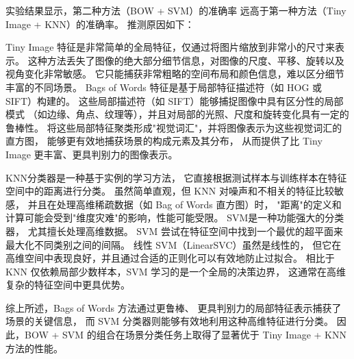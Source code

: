 实验结果显示，第二种方法（BOW + SVM）的准确率
远高于第一种方法（Tiny Image + KNN）的准确率。
推测原因如下：

Tiny Image 特征是非常简单的全局特征，仅通过将图片缩放到非常小的尺寸来表示。
这种方法丢失了图像的绝大部分细节信息，对图像的尺度、平移、旋转以及视角变化非常敏感。
它只能捕获非常粗略的空间布局和颜色信息，难以区分细节丰富的不同场景。
Bags of Words 特征是基于局部特征描述符（如 HOG 或 SIFT）构建的。
这些局部描述符（如 SIFT）能够捕捉图像中具有区分性的局部模式
（如边缘、角点、纹理等），并且对局部的光照、尺度和旋转变化具有一定的鲁棒性。
将这些局部特征聚类形成"视觉词汇"，并将图像表示为这些视觉词汇的直方图，
能够更有效地捕获场景的构成元素及其分布，
从而提供了比 Tiny Image 更丰富、更具判别力的图像表示。


KNN分类器是一种基于实例的学习方法，
它直接根据测试样本与训练样本在特征空间中的距离进行分类。
虽然简单直观，但 KNN 对噪声和不相关的特征比较敏感，
并且在处理高维稀疏数据（如 Bag of Words 直方图）时，
"距离"的定义和计算可能会受到"维度灾难"的影响，性能可能受限。
SVM是一种功能强大的分类器，
尤其擅长处理高维数据。
SVM 尝试在特征空间中找到一个最优的超平面来最大化不同类别之间的间隔。
线性 SVM（LinearSVC）虽然是线性的，
但它在高维空间中表现良好，并且通过合适的正则化可以有效地防止过拟合。
相比于 KNN 仅依赖局部少数样本，SVM 学习的是一个全局的决策边界，
这通常在高维复杂的特征空间中更具优势。

综上所述，Bags of Words 方法通过更鲁棒、
更具判别力的局部特征表示捕获了场景的关键信息，
而 SVM 分类器则能够有效地利用这种高维特征进行分类。
因此，BOW + SVM 的组合在场景分类任务上取得了显著优于 Tiny Image + KNN 方法的性能。
